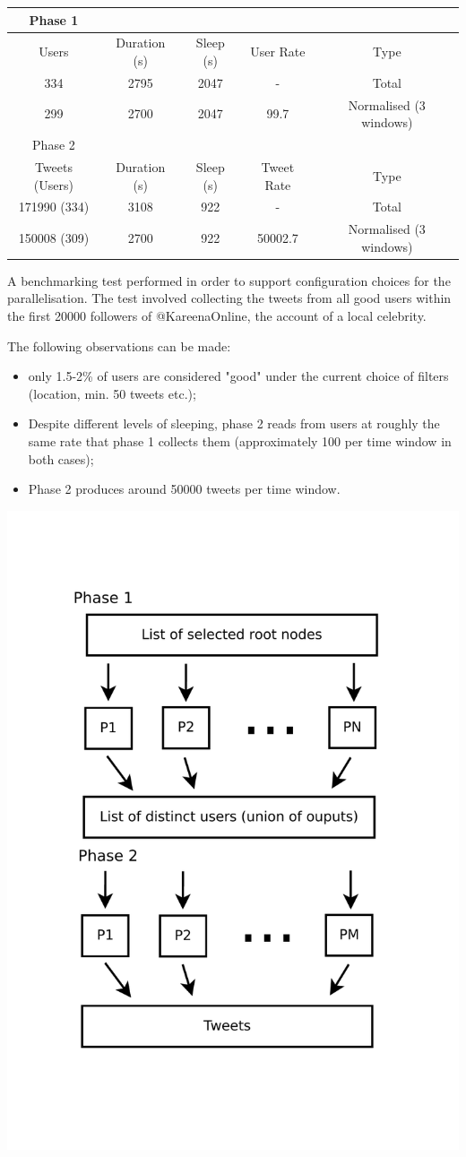 \begin{center}
  \begin{tabular}{ | c | c | c | c | c | }
    \hline
    Phase 1  \\ \hline
    Users & Duration (s) & Sleep (s) & User Rate & Type \\ \hline
    334 & 2795 & 2047 & - & Total \\ \hline	    
    299 & 2700 & 2047 & 99.7 & Normalised (3 windows) \\ \hline
    Phase 2 \\ \hline
    Tweets (Users) & Duration (s) & Sleep (s) & Tweet Rate & Type \\ \hline
    171990 (334) & 3108 & 922 & - & Total \\ \hline
    150008 (309) & 2700 & 922 & 50002.7 &  Normalised (3 windows) \\ \hline
  \end{tabular}
  \end{center}

A benchmarking test performed in order to support configuration choices for the parallelisation. The test involved collecting the tweets from all good users within the first 20000 followers of @KareenaOnline, the account of a local celebrity.

The following observations can be made:
\begin{itemize}
\item only 1.5-2\% of users are considered "good" under the current choice of filters (location, min. 50 tweets etc.);
\item Despite different levels of sleeping, phase 2 reads from users at roughly the same rate that phase 1 collects them (approximately 100 per time window in both cases);
\item Phase 2 produces around 50000 tweets per time window.
\end{itemize}

\includegraphics[width=.7\textwidth]{./img/CollectionProcess.pdf}

